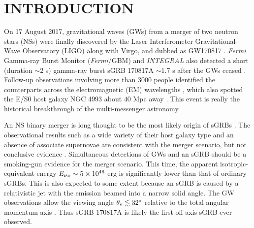 \documentclass{emulateapj}
\begin{document}
\section{INTRODUCTION}

On 17 August 2017, gravitational waves (GWs) from a merger of two neutron stars (NSs)
were finally discovered by
the Laser Interferometer Gravitational-Wave Observatory (LIGO) along with Virgo,
and dubbed as GW170817 \citep{2017PhRvL.119p1101A}.
{\it Fermi} Gamma-ray Burst Monitor ({\it Fermi}/GBM) and {\it INTEGRAL} 
also detected a short (duration $\sim 2$ s) gamma-ray burst sGRB 170817A 
$\sim 1.7$ s after the GWs ceased
\citep{2017ApJ...848L..13A, 2017arXiv171005449S, 2017arXiv171005446G}.
Follow-up observations involving more than 3000 people identified the counterparts
across the electromagnetic (EM) wavelengths \citep{2017ApJ...848L..12A},
which also spotted the E/S0 host galaxy NGC 4993 about $40$ Mpc away \citep{2017ApJ...848L..31H, 2017ApJ...849L..16I}.
This event is really the historical breakthrough of the multi-messenger astronomy.

An NS binary merger is long thought to be
the most likely origin of sGRBs \citep[e.g., ][]{1986ApJ...308L..43P, 1989Natur.340..126E, 1992ApJ...397..570M, 1992ApJ...395L..83N}.
The observational results such as a wide variety of their host galaxy type and an absence of associate supernovae 
are consistent with the merger scenario, but not conclusive evidence \citep[e.g., ][]{2014ARA&A..52...43B}. 
Simultaneous detections of GWs and an sGRB should be
a smoking-gun evidence for the merger scenario.
This time, the apparent isotropic-equivalent energy
$E_{\rm iso} \sim 5 \times 10^{46}$ erg is significantly 
lower than that of ordinary sGRBs.
This is also expected to some extent because 
an sGRB is caused by a relativistic jet 
with the emission beamed into a narrow solid angle.
The GW observations allow the viewing angle 
$\theta_{\rm v} \lesssim 32^{\circ}$
relative to the total angular momentum axis
\citep{2017PhRvL.119p1101A, 2017Natur.551...85A}.
Thus sGRB 170817A is likely the first off-axis sGRB ever observed.
\end{document}

